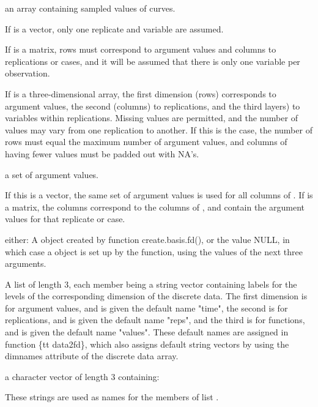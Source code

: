 \begin{Arguments}
\begin{ldescription}
\item[\code{y}] an array containing sampled values of curves.

If  is a vector, only one replicate and variable are
assumed.

If  is a matrix, rows must correspond to argument values and
columns to replications or cases, and it will be assumed that there
is only one variable per observation.

If  is a three-dimensional array, the first dimension (rows)
corresponds to argument values, the second (columns) to
replications, and the third layers) to variables within
replications.  Missing values are permitted, and the number of
values may vary from one replication to another.  If this is the
case, the number of rows must equal the maximum number of argument
values, and columns of  having fewer values must be padded
out with NA's. 

\item[\code{argvals}] a set of argument values.

If this is a vector, the same set of argument values is used for all
columns of .  If  is a matrix, the columns
correspond to the columns of , and contain the argument
values for that replicate or case.    

\item[\code{basisobj}] either:  A  object created by function
create.basis.fd(), 
or the value NULL, in which case a  object is set up
by the function, using the values of the next three arguments.

\item[\code{fdnames}] A list of length 3, each member being a string vector containing
labels for the levels of the corresponding dimension of the discrete
data.  The first dimension is for argument values, and is given the
default name "time", the second is for replications, and is given
the default name "reps", and the third is for functions, and is
given the default name "values".  These default names are
assigned in function \{tt data2fd\}, which also assigns default
string vectors by using the dimnames attribute of the discrete data
array. 

\item[\code{argnames}] a character vector of length 3 containing:


These strings are used as names for the members of list .

\end{ldescription}
\end{Arguments}
